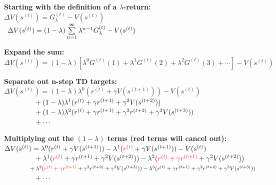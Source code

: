 \documentclass[11pt]{article}
\begin{document}
\begin{large}
    \textbf{Starting with the definition of a $\lambda$-return:}\\\vspace{1mm}
    $\Delta V(s^{(t)}) = G_{\lambda}^{(t)} - V(s^{(t)})$\\
    $\null\;\,\Delta V(s^{(t)}) = (1 - \lambda) \sum\limits_{n=1}^{\infty} \lambda^{n-1} G_{\lambda}^{(t)} - V(s^{(t)})$
    
    \textbf{Expand the sum:}\\\vspace{1mm}
    $\Delta V(s^{(t)}) = (1 - \lambda) [\lambda^0 G^{(t)}(1) + \lambda^1 G^{(t)}(2) + \lambda^2 G^{(t)}(3)+\cdots] - V(s^{(t)})$
    
    \textbf{Separate out n-step TD targets:}\\\vspace{1mm}
    $\Delta V(s^{(t)}) = (1 - \lambda) \lambda^0 (r^{(t)} + \gamma V(s^{(t+1)})) - V(s^{(t)})$\\
    $\null \hspace{15mm} + (1 - \lambda) \lambda^1 (r^{(t)} + \gamma r^{(t+1)} + \gamma^2 V(s^{(t+2)}))$\\
    $\null \hspace{15mm} + (1 - \lambda) \lambda^2 (r^{(t)} + \gamma r^{(t+1)} + \gamma^2 r^{(t+2)} + \gamma^3 V(s^{(t+3)}))$\\
    $\null \hspace{15mm} + \cdots$
    
    \textbf{Multiplying out the $(1-\lambda)$ terms (red terms will cancel out):}\\\vspace{1mm}
    $\Delta V(s^{(t)}) = \lambda^0 (r^{(t)} + \gamma V(s^{(t+1)})) - \lambda^1 (\textcolor{red}{r^{(t)}} + \gamma V(s^{(t+1)})) - V(s^{(t)})$\\
    $\null \hspace{15mm} + \lambda^1 (\textcolor{red}{r^{(t)}} + \gamma r^{(t+1)} + \gamma^2 V(s^{(t+2)})) - \lambda^2 (\textcolor{red}{r^{(t)} + \gamma r^{(t+1)}} + \gamma^2 V(s^{(t+2)}))$\\
    $\null \hspace{15mm} + \lambda^2 (\textcolor{red}{r^{(t)} + \gamma r^{(t+1)}} + \gamma^2 r^{(t+2)} + \gamma^3 V(s^{(t+3)})) - \lambda^3 (r^{(t)} + \gamma r^{(t+1)} + \gamma^2 r^{(t+2)} + \gamma^3 V(s^{(t+3)}))$\\
    $\null \hspace{15mm} + \cdots$
    

\end{large}
\end{document}

